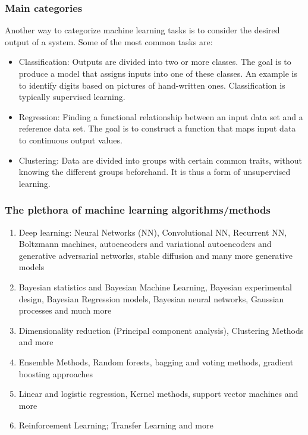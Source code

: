 \documentclass{beamer}
\begin{document}
\begin{frame}
\frametitle{Main categories}

\begin{block}{}
Another way to categorize machine learning tasks is to consider the desired output of a system.
Some of the most common tasks are:

\begin{itemize}
  \item Classification: Outputs are divided into two or more classes. The goal is to   produce a model that assigns inputs into one of these classes. An example is to identify  digits based on pictures of hand-written ones. Classification is typically supervised learning.

  \item Regression: Finding a functional relationship between an input data set and a reference data set.   The goal is to construct a function that maps input data to continuous output values.

  \item Clustering: Data are divided into groups with certain common traits, without knowing the different groups beforehand.  It is thus a form of unsupervised learning.
\end{itemize}

\noindent
\end{block}
\end{frame}

\begin{frame}
\frametitle{The plethora  of machine learning algorithms/methods}

\begin{enumerate}
\item Deep learning: Neural Networks (NN), Convolutional NN, Recurrent NN, Boltzmann machines, autoencoders and variational autoencoders  and generative adversarial networks, stable diffusion and many more generative models

\item Bayesian statistics and Bayesian Machine Learning, Bayesian experimental design, Bayesian Regression models, Bayesian neural networks, Gaussian processes and much more

\item Dimensionality reduction (Principal component analysis), Clustering Methods and more

\item Ensemble Methods, Random forests, bagging and voting methods, gradient boosting approaches 

\item Linear and logistic regression, Kernel methods, support vector machines and more

\item Reinforcement Learning; Transfer Learning and more 
\end{enumerate}

\noindent
\end{frame}
\end{document}
